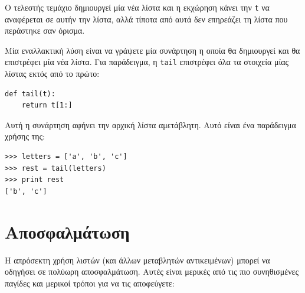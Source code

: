 \documentclass[10pt]{book}
\begin{document}
 
Ο τελεστής τεμάχιο δημιουργεί μία νέα λίστα και η εκχώρηση κάνει την {\tt t} να αναφέρεται σε αυτήν την λίστα, αλλά τίποτα από αυτά δεν επηρεάζει τη λίστα που περάστηκε σαν όρισμα.

Μία εναλλακτική λύση είναι να γράψετε μία συνάρτηση η οποία θα δημιουργεί και θα επιστρέφει μία νέα λίστα. Για παράδειγμα, η {\tt tail} επιστρέφει όλα τα στοιχεία μίας λίστας εκτός από το πρώτο:

\begin{verbatim}
def tail(t):
    return t[1:]
\end{verbatim}
%
 
Αυτή η συνάρτηση αφήνει την αρχική λίστα αμετάβλητη.
Αυτό είναι ένα παράδειγμα χρήσης της:

\begin{verbatim}
>>> letters = ['a', 'b', 'c']
>>> rest = tail(letters)
>>> print rest
['b', 'c']
\end{verbatim}


 
\section{Αποσφαλμάτωση}

Η απρόσεκτη χρήση λιστών (και άλλων μεταβλητών αντικειμένων) μπορεί να οδηγήσει σε πολύωρη αποσφαλμάτωση. Αυτές είναι μερικές από τις πιο συνηθισμένες παγίδες και μερικοί τρόποι για να τις αποφεύγετε:
\end{document}
